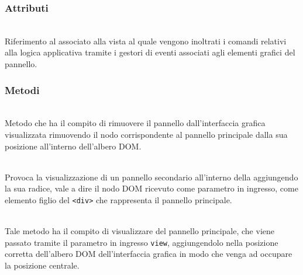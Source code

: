 \subsubsection*{Attributi}
\begin{description}
  \item{}\\
  Riferimento al  associato alla vista al quale vengono inoltrati i comandi relativi alla logica applicativa tramite i gestori di eventi associati agli elementi grafici del pannello.
\end{description}

\subsubsection*{Metodi}
\begin{description}
  \item{}\\
  Metodo che ha il compito di rimuovere il pannello dall'interfaccia grafica visualizzata rimuovendo il nodo corrispondente al pannello principale dalla sua posizione all'interno dell'albero DOM\@.
  
  \item{}\\
  Provoca la visualizzazione di un pannello secondario all'interno della  aggiungendo la sua radice, vale a dire il nodo DOM ricevuto come parametro in ingresso, come elemento figlio del \verb'<div>' che rappresenta il pannello principale.

  \item{}\\
  Tale metodo ha il compito di visualizzare del pannello principale, che viene passato tramite il parametro in ingresso \verb'view', aggiungendolo nella posizione corretta dell'albero DOM dell'interfaccia grafica in modo che venga ad occupare la posizione centrale.
  
\end{description}


